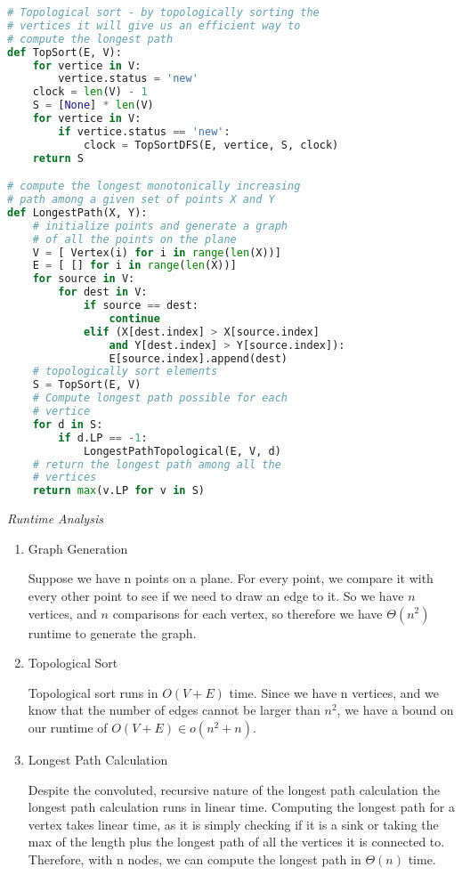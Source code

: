 \documentclass[11pt, letterpaper]{article}
\begin{document}
\begin{enumerate}
\begin{lstlisting}[language=Python]
# Topological sort - by topologically sorting the
# vertices it will give us an efficient way to
# compute the longest path
def TopSort(E, V):
    for vertice in V:
        vertice.status = 'new'
    clock = len(V) - 1
    S = [None] * len(V)
    for vertice in V:
        if vertice.status == 'new':
            clock = TopSortDFS(E, vertice, S, clock)
    return S

# compute the longest monotonically increasing 
# path among a given set of points X and Y
def LongestPath(X, Y):
    # initialize points and generate a graph
    # of all the points on the plane
    V = [ Vertex(i) for i in range(len(X))]
    E = [ [] for i in range(len(X))]
    for source in V:
        for dest in V:
            if source == dest:
                continue
            elif (X[dest.index] > X[source.index] 
                and Y[dest.index] > Y[source.index]):
                E[source.index].append(dest)
    # topologically sort elements
    S = TopSort(E, V)
    # Compute longest path possible for each
    # vertice
    for d in S:
        if d.LP == -1:
            LongestPathTopological(E, V, d)
    # return the longest path among all the 
    # vertices
    return max(v.LP for v in S)
\end{lstlisting}

\pagebreak

\begin{center}
\textit{Runtime Analysis}
\end{center}

\begin{enumerate}
\item Graph Generation

\quad Suppose we have n points on a plane. For every point, we compare it with every other point to see if we need to draw an edge to it. So we have $n$ vertices, and $n$ comparisons for each vertex, so therefore we have $\Theta(n^2)$ runtime to generate the graph.

\item Topological Sort

\quad Topological sort runs in $O(V + E)$ time. Since we have n vertices, and we know that the number of edges cannot be larger than $n^2$, we have a bound on our runtime of $O(V + E) \in o(n^2 + n)$.

\item Longest Path Calculation

\quad Despite the convoluted, recursive nature of the longest path calculation the longest path calculation runs in linear time. Computing the longest path for a vertex takes linear time, as it is simply checking if it is a sink or taking the max of the length plus the longest path of all the vertices it is connected to. Therefore, with n nodes, we can compute the longest path in $\Theta(n)$ time.


\end{enumerate}
\end{enumerate}
\end{document}
